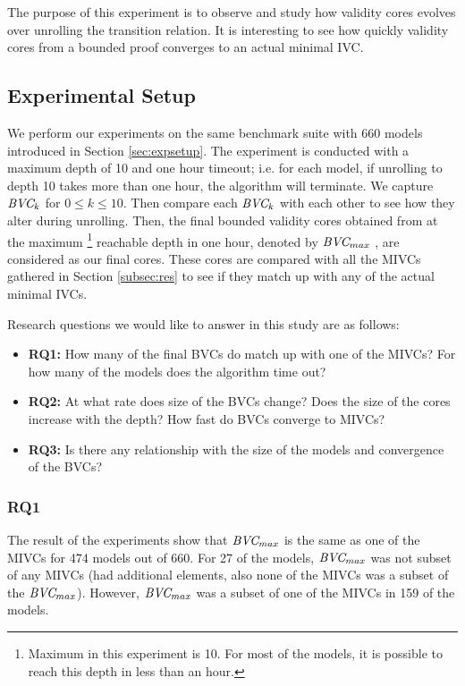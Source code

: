 The purpose of this experiment is to observe and study how validity cores evolves over unrolling the transition relation. It is interesting to see how quickly validity cores from a bounded proof converges to an actual minimal IVC.

\subsection{Experimental Setup}
  We perform our experiments on the same benchmark suite with 660 models introduced in Section \ref{sec:expsetup}. The experiment is conducted with a maximum depth of 10 and one hour timeout; i.e. for each model, if unrolling to depth 10 takes more than one hour, the \bvcalg algorithm will terminate. We capture $\textit{BVC} _{k}$ for $ 0 \leq k \le 10$. Then compare each $\textit{BVC} _{k}$ with each other to see how they alter during unrolling. Then, the final bounded validity cores obtained from at the maximum
  \footnote{Maximum in this experiment is 10. For most of the models, it is possible to reach this depth in less than an hour.}
  reachable depth in one hour, denoted by $\textit{BVC} _{max}$ , are considered as our final cores. These cores are compared with all the MIVCs gathered in Section \ref{subsec:res} to see if they match up with any of the actual minimal IVCs.

Research questions we would like to answer in this study are as follows:
\begin{itemize}
  \item \textbf{RQ1:} How many of the final BVCs do match up with one of the MIVCs? For how many of the models does the algorithm time out?
  \item \textbf{RQ2:} At what rate does size of the BVCs change? Does the size of the cores increase with the depth? How fast do BVCs converge to MIVCs?
  \item \textbf{RQ3:} Is there any relationship with the size of the models and convergence of the BVCs?
\end{itemize}

\vspace{0.1in}
\subsubsection{RQ1}
The result of the experiments show that $\textit{BVC} _{max}$ is the same as one of the MIVCs for 474 models out of 660. For 27 of the models, $\textit{BVC} _{max}$ was not subset of any MIVCs (had additional elements, also none of the MIVCs was a subset of the $\textit{BVC} _{max}$). However, $\textit{BVC} _{max}$ was a subset of one of the MIVCs in 159 of the models.


